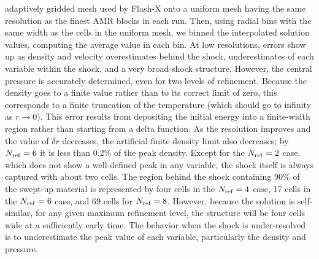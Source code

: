 adaptively gridded mesh used by Flash-X onto a uniform mesh having the
same resolution as the finest AMR blocks in each run. Then, using
radial bins with the same width as the cells in the uniform mesh, we
binned the interpolated solution values, computing the average value
in each bin. At low resolutions, errors show up as density and
velocity overestimates behind the shock, underestimates of each
variable within the shock, and a very broad shock structure.
However, the central pressure is accurately determined, even for two
levels of refinement. Because the density goes to a finite value
rather than to its correct limit of zero, this corresponds to a
finite truncation of the temperature (which should go to infinity as
$r\rightarrow 0$).  This error results from depositing the initial
energy into a finite-width region rather than starting from a delta
function. As the resolution improves and the value of $\delta r$
decreases, the artificial finite density limit also decreases; by
$N_{\rm ref}=6$ it is less than 0.2\% of the peak density. Except
for the $N_{\rm ref}=2$ case, which does not show a well-defined
peak in any variable, the shock itself is always captured with about
two cells. The region behind the shock containing 90\% of the
swept-up material is represented by four cells in the $N_{\rm
ref}=4$ case, 17 cells in the $N_{\rm ref}=6$ case, and 69 cells for
$N_{\rm ref}=8$. However, because the solution is self-similar, for
any given maximum refinement level, the structure will be four cells
wide at a sufficiently early time. The behavior when the shock is
under-resolved is to underestimate the peak value of each variable,
particularly the density and pressure.

